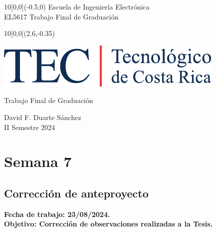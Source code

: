 \documentclass[12pt,letterpaper]{article}
\newcommand{\EstudianteA}{David F. Duarte Sánchez}
\begin{document}
	
\graphicspath{{./}{./fig/}}


%
\begin{textblock}{10}[0,0](-0.5,0)
	\large Escuela de Ingeniería Electrónica \\ 
	EL5617 Trabajo Final de Graduación \\
\end{textblock}

%
\begin{textblock}{10}[0,0](2.6,-0.35)
	\begin{flushright}
		\includegraphics[scale=0.8]{Firma_TEC-4.pdf}
	\end{flushright}
\end{textblock}

\begin{center}
	\vspace{70mm}
	{\large\color{tecRojo} Trabajo Final de Graduación}
	\par\vspace{8mm}
	{\Large\bf\color{tecAzul}{Bitácora de Trabajo - Entrega 2}}
	\par\vspace{100mm}
	{{\EstudianteA \\ II Semestre 2024} 
	\vspace{8mm}}
\end{center}

\newpage

\renewcommand{\baselinestretch}{1.1}    %


\section{Semana 7}
\subsection{Corrección de anteproyecto}

\bf{Fecha de trabajo:} 23/08/2024.\\
\bf{Objetivo:} Corrección de observaciones realizadas a la Tesis.
\end{document}
